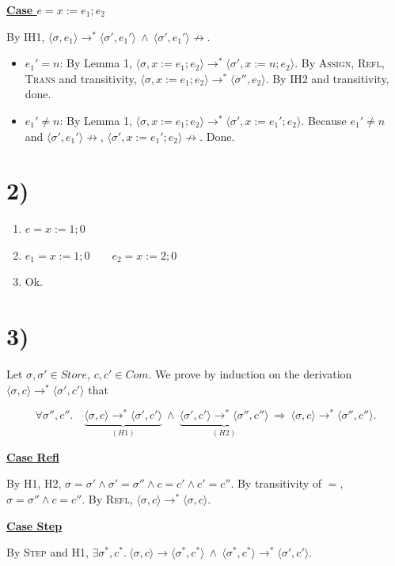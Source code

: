 \documentclass[11pt]{article}
\newcommand{\Com}{\mathit{Com}}
\newcommand{\Store}{\mathit{Store}}
\newcommand{\conf}[2]{\langle #1, #2 \rangle}
\newcommand{\step}{\longrightarrow}
\newcommand{\steps}{\longrightarrow^{*}}
\newcommand{\nostep}{\not\longrightarrow}
\newcommand{\Case}[1]{\medskip\noindent\underline{\textbf{Case #1}}\smallskip\par}
\begin{document}
\Case{$e = x := e_1 ; e_2$}

By IH1, $\conf{\sigma}{e_1} \steps \conf{\sigma'}{e_1'} \ \wedge\ \conf{\sigma'}{e_1'} \nostep$.

\begin{itemize}
  \item[$\cdot$] $e_1' = n$: By Lemma 1, $\conf{\sigma}{x:=e_1;e_2} \steps \conf{\sigma'}{x:=n;e_2}$.
  By \textsc{Assign}, \textsc{Refl}, \textsc{Trans} and transitivity,
  $\conf{\sigma}{x:=e_1;e_2} \steps \conf{\sigma''}{e_2}$.
  By IH2 and transitivity, done.

  \item[$\cdot$] $e_1' \neq n$: By Lemma 1, $\conf{\sigma}{x:=e_1;e_2} \steps \conf{\sigma'}{x:=e_1';e_2}$.
  Because $e_1' \neq n$ and $\conf{\sigma'}{e_1'} \nostep$, $\conf{\sigma'}{x:=e_1';e_2} \nostep$. Done.
\end{itemize}

\section*{2)}

\begin{enumerate}[label=\alph*.]
  \item $e = x:=1;0$
  \item $e_1 = x:=1;0 \qquad e_2 = x:=2;0$
  \item Ok.
\end{enumerate}

\section*{3)}

Let $\sigma, \sigma' \in \Store$, $c, c' \in \Com$.
We prove by induction on the derivation $\conf{\sigma}{c} \steps \conf{\sigma'}{c'}$ that

\[
\forall \sigma'', c''.\quad
\underbrace{\conf{\sigma}{c} \steps \conf{\sigma'}{c'}}_{(H1)} \ \wedge\
\underbrace{\conf{\sigma'}{c'} \steps \conf{\sigma''}{c''}}_{(H2)}
\ \Longrightarrow\ \conf{\sigma}{c} \steps \conf{\sigma''}{c''}.
\]

\Case{Refl}

By H1, H2, $\sigma = \sigma' \wedge \sigma' = \sigma'' \wedge c = c' \wedge c' = c''$.
By transitivity of $=$, $\sigma = \sigma'' \wedge c = c''$.
By \textsc{Refl}, $\conf{\sigma}{c} \steps \conf{\sigma}{c}$.

\Case{Step}

By \textsc{Step} and H1, $\exists \sigma^{*}, c^{*}.\ \conf{\sigma}{c} \step \conf{\sigma^{*}}{c^{*}} \ \wedge\ \conf{\sigma^{*}}{c^{*}} \steps \conf{\sigma'}{c'}$.
\end{document}
